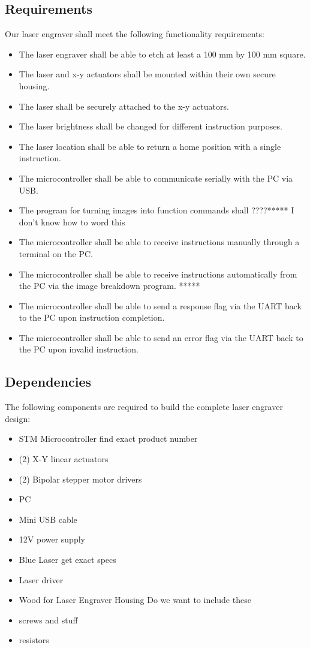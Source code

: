 \documentclass[11pt]{LaTeX-Classes/math-hw}
\begin{document}
\subsection{Requirements}
Our laser engraver shall meet the following functionality requirements:
\begin{itemize}
	\item The laser engraver shall be able to etch at least a 100 mm by 100 mm square.
	\item The laser and x-y actuators shall be mounted within their own secure housing.
	\item The laser shall be securely attached to the x-y actuators.
	\item The laser brightness shall be changed for different instruction purposes.
	\item The laser location shall be able to return a home position with a single instruction.
	\item The microcontroller shall be able to communicate serially with the PC via USB.
	\item The program for turning images into function commands shall ????***** I don't know how to word this 
	\item The microcontroller shall be able to receive instructions manually through a terminal on the PC.
	\item The microcontroller shall be able to receive instructions automatically from the PC via the image breakdown program. *****
	\item The microcontroller shall be able to send a response flag via the UART back to the PC upon instruction completion.
	\item The microcontroller shall be able to send an error flag via the UART back to the PC upon invalid instruction.
	
\end{itemize}
\subsection{Dependencies}
The following components are required to build the complete laser engraver design:
\begin{itemize}
	\item STM Microcontroller find exact product number
	\item (2) X-Y linear actuators
	\item (2) Bipolar stepper motor drivers
	\item PC
	\item Mini USB cable
	\item 12V power supply
	\item Blue Laser get exact specs
	\item Laser driver
	\item Wood for Laser Engraver Housing Do we want to include these
	\item screws and stuff
	\item resistors
	\end{itemize}
\end{document}
